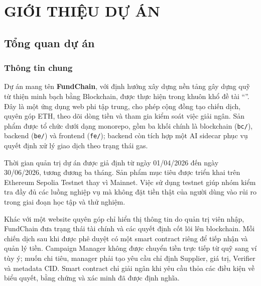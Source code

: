 \chapter{GIỚI THIỆU DỰ ÁN}

\section{Tổng quan dự án}

\subsection{Thông tin chung}

Dự án mang tên \textbf{FundChain}, với định hướng xây dựng nền tảng gây dựng quỹ từ thiện minh bạch bằng Blockchain, được thực hiện trong khuôn khổ đề tài ``\projecttitle''. Đây là một ứng dụng web phi tập trung, cho phép cộng đồng tạo chiến dịch, quyên góp ETH, theo dõi dòng tiền và tham gia kiểm soát việc giải ngân. Sản phẩm được tổ chức dưới dạng monorepo, gồm ba khối chính là blockchain (\texttt{bc/}), backend (\texttt{be/}) và frontend (\texttt{fe/}); backend còn tích hợp một AI sidecar phục vụ quyết định xử lý giao dịch theo trạng thái gas.

Thời gian quản trị dự án được giả định từ ngày 01/04/2026 đến ngày 30/06/2026, tương đương ba tháng. Sản phẩm mục tiêu được triển khai trên Ethereum Sepolia Testnet thay vì Mainnet. Việc sử dụng testnet giúp nhóm kiểm tra đầy đủ các luồng nghiệp vụ mà không đặt tiền thật của người dùng vào rủi ro trong giai đoạn học tập và thử nghiệm.

Khác với một website quyên góp chỉ hiển thị thông tin do quản trị viên nhập, FundChain đưa trạng thái tài chính và các quyết định cốt lõi lên blockchain. Mỗi chiến dịch sau khi được phê duyệt có một smart contract riêng để tiếp nhận và quản lý tiền. Campaign Manager không được chuyển tiền trực tiếp từ quỹ sang ví tùy ý; muốn chi tiêu, manager phải tạo yêu cầu chỉ định Supplier, giá trị, Verifier và metadata CID. Smart contract chỉ giải ngân khi yêu cầu thỏa các điều kiện về biểu quyết, bằng chứng và xác minh đã được định nghĩa.

